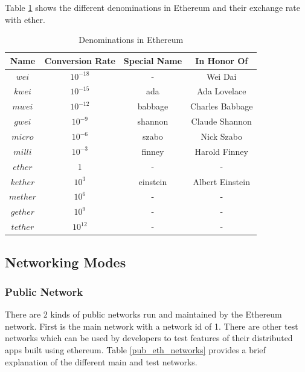 \documentclass[11pt,openright]{report}
\begin{document}
Table \ref{eth_denominations} shows the different denominations in Ethereum and their exchange rate with ether.

\begin{table}[!htbp]
	\renewcommand{\arraystretch}{1.3}
	\caption{Denominations in Ethereum}
	\label{eth_denominations}
	\centering
	\begin{tabular}{|c||c|c|c|}
		\hline
		\bfseries Name & \bfseries Conversion Rate & \bfseries Special Name & \bfseries In Honor Of\\
		\hline\hline
		$wei$ & $10^{-18}$ & - & Wei Dai \\ \hline
	    $kwei$ & $10^{-15}$ & ada & Ada Lovelace \\ \hline
	    $mwei$ & $10^{-12}$ & babbage & Charles Babbage \\ \hline
	    $gwei$ & $10^{-9}$ & shannon & Claude Shannon \\ \hline
	    $micro$ & $10^{-6}$ & szabo & Nick Szabo \\ \hline
	    $milli$ & $10^{-3}$ & finney & Harold Finney \\ \hline
	    $ether$ & 1 & - & - \\ \hline
	    $kether$ & $10^{3}$ & einstein & Albert Einstein \\ \hline
	    $mether$ & $10^{6}$ & - & - \\ \hline
	    $gether$ & $10^{9}$ & - & - \\ \hline
	    $tether$ & $10^{12}$ & - & - \\ \hline

	\end{tabular}
\end{table}
\newpage
\subsection{Networking Modes}
\subsubsection{Public Network}
There are 2 kinds of public networks run and maintained by the Ethereum network. 
First is the main network with a network id of 1. There are other test networks which can be used by developers to test features of their distributed apps built using ethereum. Table \ref{pub_eth_networks} provides a brief explanation of the different main and test networks. 
\end{document}
